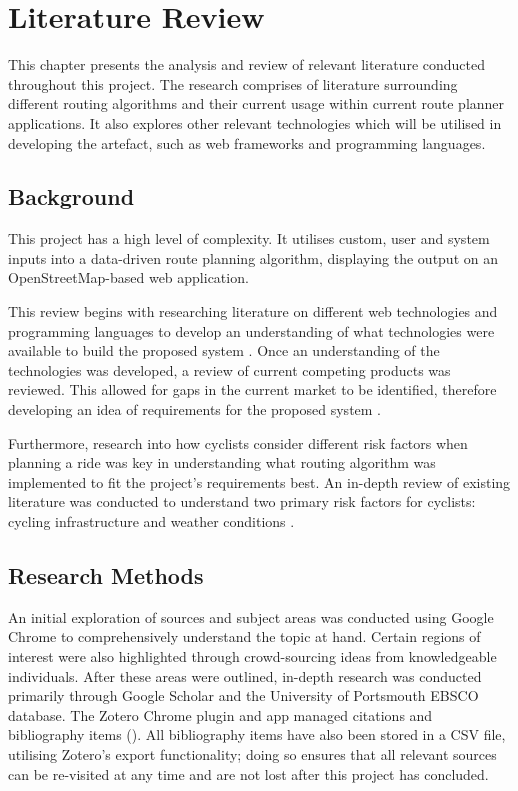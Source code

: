 \chapter{Literature Review} 
\label{chap:litrev}

This chapter presents the analysis and review of relevant literature conducted throughout this project. The research comprises of literature surrounding different routing algorithms and their current usage within current route planner applications. It also explores other relevant technologies which will be utilised in developing the artefact, such as web frameworks and programming languages.

\section{Background}
\label{litrev:background}
This project has a high level of complexity. It utilises custom, user and system inputs
into a data-driven route planning algorithm, displaying the output on an OpenStreetMap-based web application. 

This review begins with researching literature on different web technologies and programming languages to develop an understanding of what technologies were available to build the proposed system . Once an understanding of the technologies was developed, a review of current competing products was reviewed. This allowed for gaps in the current market to be identified, therefore developing an idea of requirements for the proposed system . 

Furthermore, research into how cyclists consider different risk factors when planning a ride was key in understanding what routing algorithm was implemented to fit the project's requirements best. An in-depth review of existing literature was conducted to understand two primary risk factors for cyclists: cycling infrastructure  and weather conditions . 

\section{Research Methods}
\label{litrev:researchmethod}

An initial exploration of sources and subject areas was conducted using Google Chrome to comprehensively understand the topic at hand. Certain regions of interest were also highlighted through crowd-sourcing ideas from knowledgeable individuals. After these areas were outlined, in-depth research was conducted primarily through Google Scholar and the University of Portsmouth EBSCO database. The Zotero Chrome plugin and app managed citations and bibliography items (\cite{noauthor_zotero_nodate}). All bibliography items have also been stored in a CSV file, utilising Zotero's export functionality; doing so ensures that all relevant sources can be re-visited at any time and are not lost after this project has concluded.

